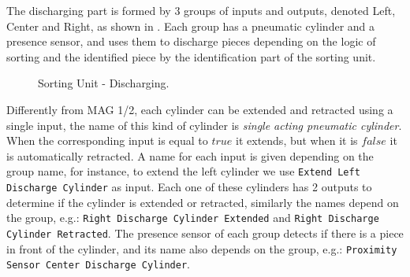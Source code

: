 The discharging part is formed by 3 groups of inputs and outputs, denoted Left, Center and
Right, as shown in . 
Each group has a pneumatic cylinder and a presence sensor, and uses them to discharge pieces
depending on the logic of sorting and the identified piece by the identification
part of the sorting unit.
\begin{figure}[H]
  \centering
  \caption{Sorting Unit - Discharging.}
  \label{fig:sortDisc}
\end{figure}
Differently from MAG 1/2, each cylinder can be extended and retracted
using a single input, the name of this kind of cylinder is \emph{
single acting pneumatic cylinder}. When the corresponding input is equal to $true$ it
extends, but when it is $false$ it is automatically retracted.
A name for each input is given depending on the group name, for
instance, to extend the left cylinder we use
\verb|Extend Left Discharge Cylinder| as input.
Each one of these cylinders has 2 outputs to determine if the cylinder is
extended or retracted, similarly the names depend on the group, e.g.:
\verb|Right Discharge Cylinder Extended| and
\verb|Right Discharge Cylinder Retracted|.
The presence sensor of each group detects if there is a piece in front of the
cylinder, and its name also depends on the group, e.g.:
\verb|Proximity Sensor Center Discharge Cylinder|.

